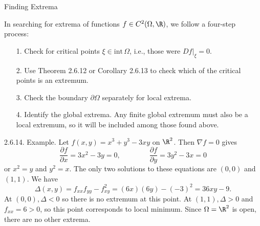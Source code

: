 \documentclass[smaller,hyperref={CJKbookmarks=true}]{beamer}
\begin{document}
\begin{frame}{Finding Extrema}
\begin{spacing}{1.1}
In searching for extrema of functions $f\in C^2(\Omega,\R)$, we follow a four-step process:
\begin{itemize}
  \item[1.] Check for critical points $\xi\in\text{int}\,\Omega$, i.e., those were $Df|_\xi=0$.
  \item[2.] Use Theorem 2.6.12 or Corollary 2.6.13 to check which of the critical points is an extremum.
  \item[3.] Check the boundary $\partial\Omega$ separately for local extrema.
  \item[4.] Identify the global extrema. Any finite global extremum must also be
a local extremum, so it will be included among those found above.
\end{itemize}
\alert{2.6.14. Example.} Let $f(x,y)=x^3+y^3-3xy$ on $\R^2$. Then $\nabla f=0$ gives
\[\frac{\partial f}{\partial x}=3x^2-3y=0,\qquad\qquad
\frac{\partial f}{\partial y}=3y^2-3x=0\]
or $x^2=y$ and $y^2=x$. The only two solutions to these equations are $(0,0)$ and $(1,1)$.
\newpage
We have
\[\Delta(x,y)=f_{xx}f_{yy}-f_{xy}^2=(6x)(6y)-(-3)^2=36xy-9.\]
At $(0,0),\Delta<0$ so there is no extremum at this point. At $(1,1),\Delta>0$ and $f_{xx}=6>0$, so this point corresponds to local minimum. Since $\Omega=\R^2$ is open, there are no other extrema.
\end{spacing}
\end{frame}
\end{document}
